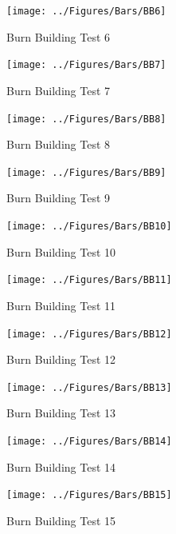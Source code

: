 \documentclass[12pt,oneside]{book}
\begin{document}
\begin{figure}[!ht]
	\texttt{[image: ../Figures/Bars/BB6]}
	\caption{Burn Building Test 6}
	\label{fig:Burn_Building_Test_6}
\end{figure}

\begin{figure}[!ht]
	\texttt{[image: ../Figures/Bars/BB7]}
	\caption{Burn Building Test 7}
	\label{fig:Burn_Building_Test_7}
\end{figure}

\begin{figure}[!ht]
	\texttt{[image: ../Figures/Bars/BB8]}
	\caption{Burn Building Test 8}
	\label{fig:Burn_Building_Test_8}
\end{figure}

\clearpage

\begin{figure}[!ht]
	\texttt{[image: ../Figures/Bars/BB9]}
	\caption{Burn Building Test 9}
	\label{fig:Burn_Building_Test_9}
\end{figure}

\begin{figure}[!ht]
	\texttt{[image: ../Figures/Bars/BB10]}
	\caption{Burn Building Test 10}
	\label{fig:Burn_Building_Test_10}
\end{figure}

\begin{figure}[!ht]
	\texttt{[image: ../Figures/Bars/BB11]}
	\caption{Burn Building Test 11}
	\label{fig:Burn_Building_Test_11}
\end{figure}

\begin{figure}[!ht]
	\texttt{[image: ../Figures/Bars/BB12]}
	\caption{Burn Building Test 12}
	\label{fig:Burn_Building_Test_12}
\end{figure}

\clearpage

\begin{figure}[!ht]
	\texttt{[image: ../Figures/Bars/BB13]}
	\caption{Burn Building Test 13}
	\label{fig:Burn_Building_Test_13}
\end{figure}

\begin{figure}[!ht]
	\texttt{[image: ../Figures/Bars/BB14]}
	\caption{Burn Building Test 14}
	\label{fig:Burn_Building_Test_14}
\end{figure}

\begin{figure}[!ht]
	\texttt{[image: ../Figures/Bars/BB15]}
	\caption{Burn Building Test 15}
	\label{fig:Burn_Building_Test_15}
\end{figure}
\end{document}
